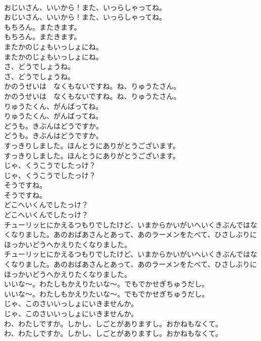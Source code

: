 \documentclass[8pt]{extreport}
\begin{document}
\begin{CJK}{UTF8}{min}
\\	おじいさん、いいから！また、いっらしゃってね。
\\	おじいさん、いいから！また、いっらしゃってね。
\\	もちろん。またきます。
\\	もちろん。またきます。
\\	またかのじょもいっしょにね。
\\	またかのじょもいっしょにね。
\\	さ、どうでしょうね。
\\	さ、どうでしょうね。
\\	かのうせいは　なくもないですね。ね、りゅうたさん。
\\	かのうせいは　なくもないですね。ね、りゅうたさん。
\\	りゅうたくん、がんばってね。
\\	りゅうたくん、がんばってね。
\\	どうも。きぶんはどうですか。
\\	どうも。きぶんはどうですか。
\\	すっきりしました。ほんとうにありがとうございます。
\\	すっきりしました。ほんとうにありがとうございます。
\\	じゃ、くうこうでしたっけ？
\\	じゃ、くうこうでしたっけ？
\\	そうですね。
\\	そうですね。
\\	どこへいくんでしたっけ？
\\	どこへいくんでしたっけ？
\\	チューリッヒにかえるつもりでしたけど、いまからかいがいへいくきぶんではなくなりました。あのおばあさんとあって、あのラーメンをたべて、ひさしぶりにほっかいどうへかえりたくなりました。
\\	チューリッヒにかえるつもりでしたけど、いまからかいがいへいくきぶんではなくなりました。あのおばあさんとあって、あのラーメンをたべて、ひさしぶりにほっかいどうへかえりたくなりました。
\\	いいな〜。わたしもかえりたいな〜。でもでかせぎちゅうだし。
\\	いいな〜。わたしもかえりたいな〜。でもでかせぎちゅうだし。
\\	じゃ、このさいいっしょにいきませんか。
\\	じゃ、このさいいっしょにいきませんか。
\\	わ、わたしですか。しかし、しごとがありますし。おかねもなくて。
\\	わ、わたしですか。しかし、しごとがありますし。おかねもなくて。

\end{CJK}
\end{document}
